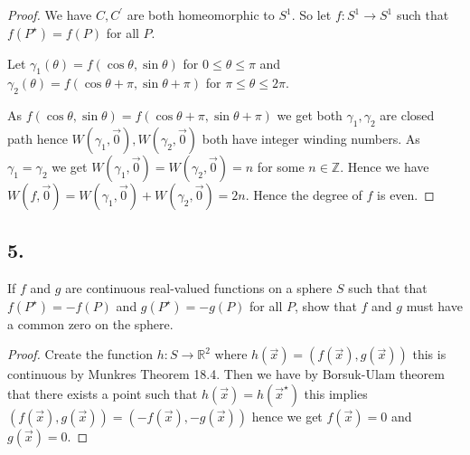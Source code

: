 \documentclass{amsart}
\theoremstyle{plain}
\theoremstyle{definition}
\theoremstyle{remark}
\begin{document}
\begin{proof}
We have $C,C^\prime$ are both homeomorphic to $S^1$. So let $f:S^1\to S^1$ such that $f(P^\star)=f(P)$ for all $P$. 

Let $\gamma_1(\theta)=f(\cos \theta ,\sin \theta )$ for $0\leq \theta \leq \pi $ and $\gamma_2(\theta)=f(\cos \theta +\pi , \sin \theta+\pi)$ for $\pi \leq \theta \leq 2\pi$. 

As $f(\cos \theta,\sin \theta )=f(\cos \theta+\pi,\sin \theta+\pi)$ we get both $\gamma_1,\gamma_2$ are closed path hence $W(\gamma_1,\vec 0),W(\gamma_2,\vec 0)$ both have integer winding numbers. As $\gamma_1=\gamma_2$ we get $W(\gamma_1,\vec 0)=W(\gamma_2,\vec 0)=n$ for some $n\in \mathbb Z$. Hence we have $W(f,\vec 0)=W(\gamma_1,\vec 0)+W(\gamma_2,\vec 0)=2n$. Hence the degree of $f$ is even.

\end{proof}

\vspace{.15in}
\noindent
\subsection*{5.}
If $f$ and $g$ are continuous real-valued functions on a sphere $S$ such that that $f(P^\star)=-f(P)$ and $g(P^\star)=-g(P)$ for all $P$, show that $f$ and $g$ must have a common zero on the sphere. 

\begin{proof}
    Create the function $h:S\to \mathbb{R}^2$ where $h(\vec x)=(f(\vec x),g(\vec x))$ this is continuous by Munkres Theorem 18.4. Then we have by Borsuk-Ulam theorem that there exists a point such that $h(\vec x)=h(\vec x^\star)$ this implies $(f(\vec x),g(\vec x))=(-f(\vec x),-g(\vec x))$ hence we get $f(\vec x)= 0$ and $g(\vec x)=0$.
\end{proof}

 
\end{document}
